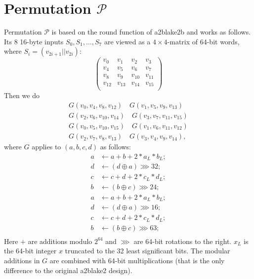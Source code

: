 \documentclass[a4paper]{article}
\begin{document}



\appendix 



\section{Permutation \texorpdfstring{$\mathcal{P}$}{P}}\label{sec:blakeround}

Permutation $\mathcal{P}$  is based on the round function of a2blake2b and works as follows. Its 8 16-byte inputs $S_0, S_1,\ldots, S_7$ are viewed as a $4\times 4$-matrix of 64-bit words, where $S_i = (v_{2i+1}||v_{2i})$:
$$
\begin{pmatrix}
  v_0 & v_1 & v_2 & v_3\\
    v_4 & v_5 & v_6 & v_7\\
      v_8 & v_9 & v_{10} & v_{11}\\
        v_{12} & v_{13} & v_{14} & v_{15}\\
\end{pmatrix}
$$
Then we do
\begin{eqnarray*}
G(v_0, v_4, v_8, v_{12})\quad G(v_1, v_5, v_9, v_{13}) \\ G(v_2, v_6, v_{10}, v_{14}) \quad G(v_3, v_7, v_{11}, v_{15})\\
G(v_0, v_5, v_{10}, v_{15})\quad G(v_1, v_6, v_{11}, v_{12}) \\ G(v_2, v_7, v_{8}, v_{13}) \quad G(v_3, v_4, v_{9}, v_{14}),
\end{eqnarray*}
where $G$  applies to $(a,b,c,d)$ as follows:
\begin{equation}\label{eq:blake-orig}
\begin{aligned}
  a &\leftarrow a + b+ 2*a_L*b_L;\\
  d &\leftarrow (d\oplus a)\ggg 32;\\
  c &\leftarrow c + d+ 2*c_L*d_L;\\
  b &\leftarrow (b\oplus c)\ggg 24;\\
    a &\leftarrow a + b+ 2*a_L*b_L;\\
  d &\leftarrow (d\oplus a)\ggg 16;\\
  c &\leftarrow c + d+ 2*c_L*d_L;\\
  b &\leftarrow (b\oplus c)\ggg 63;\\
\end{aligned}
\end{equation}
Here $+$ are additions modulo $2^{64}$ and $\ggg$ are 64-bit rotations to the right. $x_L$ is the 64-bit integer $x$ truncated to the 32 least significant bits. The modular additions in $G$ are combined with 64-bit multiplications (that is the only difference to the original a2blake2 design). 
\end{document}
